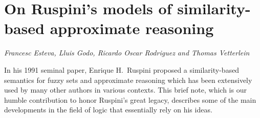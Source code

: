 \documentclass[../booklet.tex]{subfiles}
\begin{document}
\section[On Ruspini's models of similarity-based approximate reasoning. {\it Francesc Esteva, Lluis Godo, Ricardo Oscar Rodriguez and Thomas Vetterlein}]{On Ruspini's models of similarity-based approximate reasoning}
   

\begin{center}
  {\it Francesc Esteva, Lluis Godo, Ricardo Oscar Rodriguez and Thomas Vetterlein}
\end{center}

\vskip 0.8cm


%
In his 1991 seminal paper, Enrique H.\ Ruspini proposed a similarity-based semantics for fuzzy sets and approximate reasoning which has been extensively used by many other authors in various contexts. This brief note, which is our humble contribution to honor Ruspini's great legacy, describes some of the main developments in the field of logic that essentially rely on his ideas.
%
\end{document}
